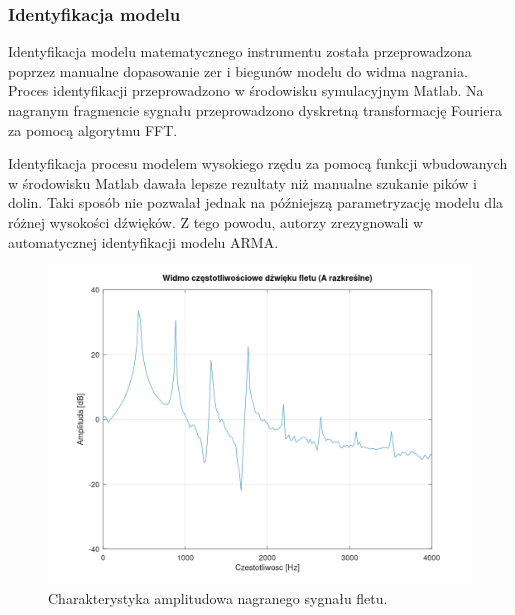 \subsubsection{Identyfikacja modelu}
Identyfikacja modelu matematycznego instrumentu została przeprowadzona poprzez manualne dopasowanie zer i biegunów modelu do widma nagrania.
Proces identyfikacji przeprowadzono w środowisku symulacyjnym Matlab. Na nagranym fragmencie sygnału przeprowadzono dyskretną transformację Fouriera za pomocą algorytmu FFT.

Identyfikacja procesu modelem wysokiego rzędu za pomocą funkcji wbudowanych w środowisku Matlab dawała lepsze rezultaty niż manualne szukanie pików i dolin. Taki sposób nie pozwalał jednak na późniejszą parametryzację modelu dla różnej wysokości dźwięków. Z tego powodu, autorzy zrezygnowali w automatycznej identyfikacji modelu ARMA.

\begin{figure}[H]
	\centering
	\includegraphics[width=12cm]{grafiki/flute_spectrum_orig}
	\captionsetup{justification=centering}
	\caption{Charakterystyka amplitudowa nagranego sygnału fletu.}
	\label{rys:flute_spectrum}
\end{figure}

